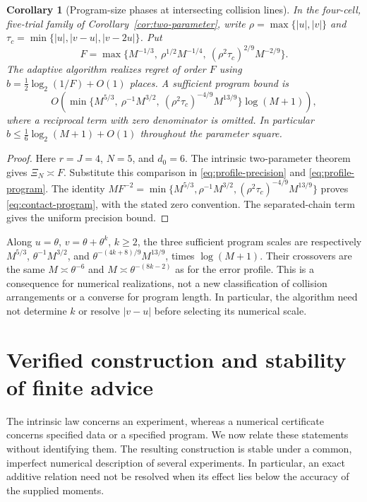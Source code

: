\documentclass[11pt]{amsart}
\newtheorem{corollary}[theorem]{Corollary}
\theoremstyle{definition}\newtheorem{definition}[theorem]{Definition}
\theoremstyle{remark}\newtheorem{remark}[theorem]{Remark}
\begin{document}
\begin{corollary}[Program-size phases at intersecting collision lines]
\label{cor:resource-phases}
In the four-cell, five-trial family of Corollary~\ref{cor:two-parameter},
write $\rho=\max\{|u|,|v|\}$ and
$\tau_c=\min\{|u|,|v-u|,|v-2u|\}$. Put
\[
 F=\max\{M^{-1/3},\ \rho^{1/2}M^{-1/4},\
                         (\rho^2\tau_c)^{2/9}M^{-2/9}\}.
\]
The adaptive algorithm realizes regret of order $F$ using
$b=\frac12\log_2(1/F)+O(1)$ places. A sufficient program bound is
\begin{equation}\label{eq:contact-program}
 O\!\left(\min\{M^{5/3},\ \rho^{-1}M^{3/2},\
                 (\rho^2\tau_c)^{-4/9}M^{13/9}\}\log(M+1)\right),
\end{equation}
where a reciprocal term with zero denominator is omitted. In particular
$b\le\frac16\log_2(M+1)+O(1)$ throughout the parameter square.
\end{corollary}
\begin{proof}
Here $r=J=4$, $N=5$, and $d_0=6$. The intrinsic two-parameter theorem
gives $\Xi_N\asymp F$. Substitute this comparison in
\eqref{eq:profile-precision} and \eqref{eq:profile-program}. The identity
$M F^{-2}=\min\{M^{5/3},\rho^{-1}M^{3/2},
(\rho^2\tau_c)^{-4/9}M^{13/9}\}$ proves
\eqref{eq:contact-program}, with the stated zero convention.
The separated-chain term gives the uniform precision bound.
\end{proof}

Along $u=\theta$, $v=\theta+\theta^k$, $k\ge2$, the three sufficient
program scales are respectively $M^{5/3}$,
$\theta^{-1}M^{3/2}$, and
$\theta^{-(4k+8)/9}M^{13/9}$, times $\log(M+1)$.
Their crossovers are the same $M\asymp\theta^{-6}$ and
$M\asymp\theta^{-(8k-2)}$ as for the error profile. This is a
consequence for numerical realizations, not a new classification of
collision arrangements or a converse for program length. In particular,
the algorithm need not determine $k$ or resolve $|v-u|$ before selecting
its numerical scale.

\section{Verified construction and stability of finite advice}
\label{sec:construction-stability}
The intrinsic law concerns an experiment, whereas a numerical certificate
concerns specified data or a specified program. We now relate these
statements without identifying them. The resulting construction is stable
under a common, imperfect numerical description of several experiments.
In particular, an exact additive relation need not be resolved when its
effect lies below the accuracy of the supplied moments.
\end{document}
